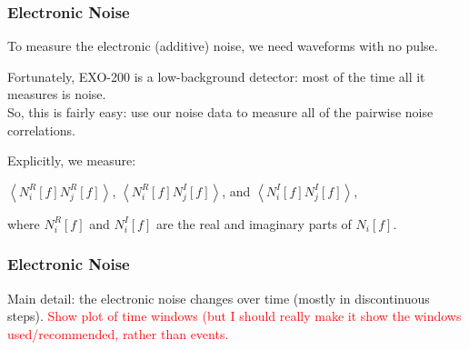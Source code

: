 \documentclass{beamer}
\begin{document}
\begin{frame}
\begin{center}
\frametitle{Electronic Noise}
\end{center}
To measure the electronic (additive) noise, we need waveforms with no pulse.

Fortunately, EXO-200 is a low-background detector: most of the time all it measures is noise.\\[\baselineskip]

So, this is fairly easy: use our noise data to measure all of the pairwise noise correlations.

Explicitly, we measure:\\
\begin{center}
$\left<N_i^R[f]N_j^R[f]\right>$, $\left<N_i^R[f]N_j^I[f]\right>$, and $\left<N_i^I[f]N_j^I[f]\right>$,\\
\end{center}
where $N_i^R[f]$ and $N_i^I[f]$ are the real and imaginary parts of $N_i[f]$.
\end{frame}

\begin{frame}
\begin{center}
\frametitle{Electronic Noise}
\end{center}
Main detail: the electronic noise changes over time (mostly in discontinuous steps).
\textcolor{red}{Show plot of time windows (but I should really make it show the windows used/recommended, rather than events.}
\end{frame}
\end{document}
